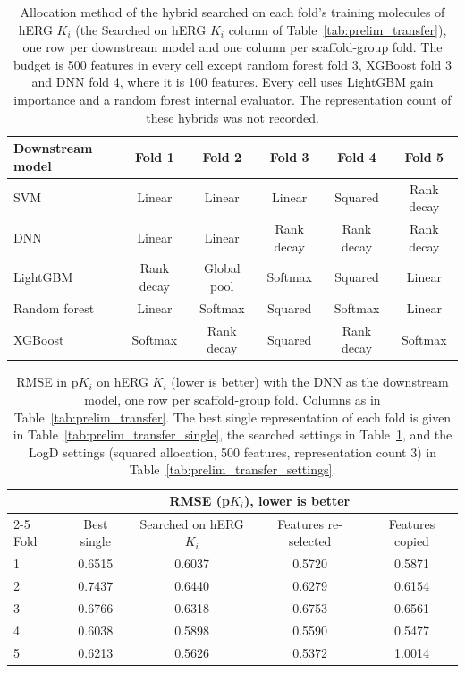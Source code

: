 \begin{table}[htbp]
\centering
\small
\begin{tabular}{@{}lccccc@{}}
\toprule
Downstream model & Fold 1 & Fold 2 & Fold 3 & Fold 4 & Fold 5 \\
\midrule
SVM & Linear & Linear & Linear & Squared & Rank decay \\
DNN & Linear & Linear & Rank decay & Rank decay & Rank decay \\
LightGBM & Rank decay & Global pool & Softmax & Squared & Linear \\
Random forest & Linear & Softmax & Squared & Softmax & Linear \\
XGBoost & Softmax & Rank decay & Squared & Rank decay & Softmax \\
\bottomrule
\end{tabular}
\caption[Settings of the hybrids searched on hERG $K_i$.]{Allocation method of the hybrid searched on each fold's training molecules of hERG $K_i$ (the Searched on hERG $K_i$ column of Table~\ref{tab:prelim_transfer}), one row per downstream model and one column per scaffold-group fold. The budget is 500 features in every cell except random forest fold 3, XGBoost fold 3 and DNN fold 4, where it is 100 features. Every cell uses LightGBM gain importance and a random forest internal evaluator. The representation count of these hybrids was not recorded.}
\label{tab:prelim_transfer_native}
\end{table}

\begin{table}[htbp]
\centering
\small
\begin{tabular}{@{}lcccc@{}}
\toprule
 & \multicolumn{4}{c}{RMSE (p$K_i$), lower is better} \\
\cmidrule(l){2-5}
Fold & Best single & Searched on hERG $K_i$ & Features re-selected & Features copied \\
\midrule
1 & 0.6515 & 0.6037 & 0.5720 & 0.5871 \\
2 & 0.7437 & 0.6440 & 0.6279 & 0.6154 \\
3 & 0.6766 & 0.6318 & 0.6753 & 0.6561 \\
4 & 0.6038 & 0.5898 & 0.5590 & 0.5477 \\
5 & 0.6213 & 0.5626 & 0.5372 & 1.0014 \\
\bottomrule
\end{tabular}
\caption[Reusing LogD settings with the DNN on hERG $K_i$, per fold.]{RMSE in p$K_i$ on hERG $K_i$ (lower is better) with the DNN as the downstream model, one row per scaffold-group fold. Columns as in Table~\ref{tab:prelim_transfer}. The best single representation of each fold is given in Table~\ref{tab:prelim_transfer_single}, the searched settings in Table~\ref{tab:prelim_transfer_native}, and the LogD settings (squared allocation, 500 features, representation count 3) in Table~\ref{tab:prelim_transfer_settings}.}
\label{tab:prelim_transfer_dnn_folds}
\end{table}

